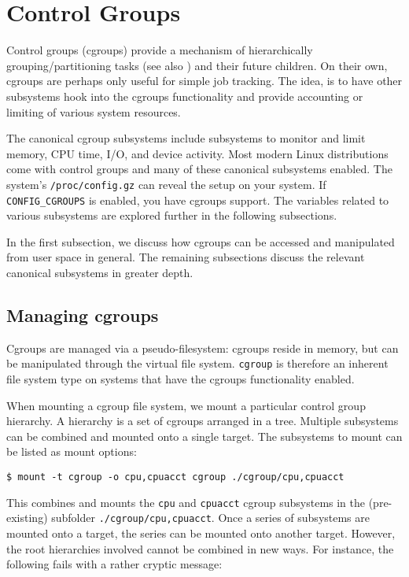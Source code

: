 
\section{Control Groups}

Control groups (cgroups) provide a mechanism of hierarchically
grouping/partitioning tasks (see also
) and their future
children\cite{cgroups-cgroups-since-linux-3.14}. On their own, cgroups are
perhaps only useful for simple job tracking. The idea, is to have other
subsystems hook into the cgroups functionality and provide accounting or
limiting of various system resources.

The canonical cgroup subsystems include subsystems to monitor and limit memory,
CPU time, I/O, and device activity. Most modern Linux distributions come with
control groups and many of these canonical subsystems enabled. The system's
\texttt{/proc/config.gz} can reveal the setup on your system\cite{man-5-proc}.
If \texttt{CONFIG\_CGROUPS} is enabled, you have cgroups support. The variables
related to various subsystems are explored further in the following
subsections.

In the first subsection, we discuss how cgroups can be accessed and manipulated
from user space in general. The remaining subsections discuss the relevant
canonical subsystems in greater depth.

\subsection{Managing cgroups}

Cgroups are managed via a pseudo-filesystem: cgroups reside in memory, but can
be manipulated through the virtual file system.  \texttt{cgroup} is therefore
an inherent file system type on systems that have the cgroups functionality
enabled.

When mounting a cgroup file system, we mount a particular control group
hierarchy. A hierarchy is a set of cgroups arranged in a tree.  Multiple
subsystems can be combined and mounted onto a single target.  The subsystems to
mount can be listed as mount options:

\begin{lstlisting}
$ mount -t cgroup -o cpu,cpuacct cgroup ./cgroup/cpu,cpuacct
\end{lstlisting}

This combines and mounts the \texttt{cpu} and \texttt{cpuacct} cgroup
subsystems in the (pre-existing) subfolder \texttt{./cgroup/cpu,cpuacct}. Once
a series of subsystems are mounted onto a target, the series can be mounted
onto another target. However, the root hierarchies involved cannot be combined
in new ways. For instance, the following fails with a rather cryptic message:

